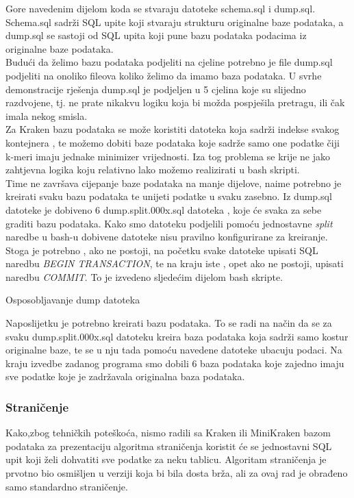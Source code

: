 \documentclass[times, utf8, zavrsni]{fer}
\begin{document}
{Gore navedenim dijelom koda se stvaraju datoteke schema.sql i dump.sql. Schema.sql sadrži SQL upite koji stvaraju strukturu originalne baze podataka, a dump.sql se sastoji od SQL upita koji pune bazu podataka podacima iz originalne baze podataka.
\\Budući da želimo bazu podataka podjeliti na cjeline potrebno je file dump.sql podjeliti na onoliko fileova koliko želimo da imamo baza podataka. U svrhe demonstracije rješenja dump.sql je podjeljen u 5 cjelina koje su slijedno razdvojene, tj. ne prate nikakvu logiku koja bi možda pospješila pretragu, ili čak imala nekog smisla. \\Za Kraken bazu podataka se može koristiti datoteka koja sadrži indekse svakog kontejnera , te možemo dobiti baze podataka koje sadrže samo one podatke čiji k-meri imaju jednake minimizer vrijednosti. Iza tog problema se krije ne jako zahtjevna logika koju relativno lako možemo realizirati u bash skripti.
\\Time ne završava cijepanje baze podataka na manje dijelove, naime potrebno je kreirati svaku bazu podataka te unijeti podatke u svaku zasebno. Iz dump.sql datoteke je dobiveno 6 dump.split.000x.sql datoteka , koje će svaka za sebe graditi bazu podataka. Kako smo datoteku podjelili pomoću jednostavne \textit{split} naredbe u bash-u dobivene datoteke nisu pravilno konfigurirane za kreiranje. Stoga je potrebno , ako ne postoji, na početku svake datoteke upisati SQL naredbu  \textit{BEGIN TRANSACTION}, te na kraju iste , opet ako ne postoji, upisati naredbu \textit{COMMIT}. To je izvedeno sljedećim dijelom bash skripte.

\begin{algorithm}[H]
	\caption{Osposobljavanje dump datoteka}
	\label{DumpBp}
\end{algorithm}

Naposlijetku je potrebno kreirati bazu podataka. To se radi na način da se za svaku dump.split.000x.sql datoteku kreira baza podataka koja sadrži samo kostur originalne baze, te se u nju tada pomoću navedene datoteke ubacuju podaci. Na kraju izvedbe zadanog programa smo dobili 6 baza podataka koje zajedno imaju sve podatke koje je zadržavala originalna baza podataka.

\subsubsection{Straničenje}
Kako,zbog tehničkih poteškoća, nismo radili sa Kraken ili MiniKraken bazom podataka za prezentaciju algoritma straničenja koristit će se jednostavni SQL upit koji želi dohvatiti sve podatke za neku tablicu. Algoritam straničenja je prvotno bio osmišljen u verziji koja bi bila dosta brža, ali za ovaj rad je obrađeno samo standardno straničenje.

}
\end{document}
